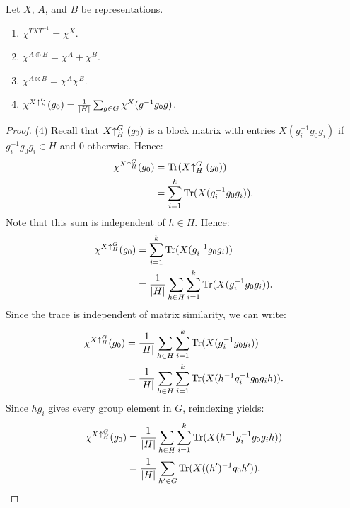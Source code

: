 \begin{proposition}
	Let $X$, $A$, and $B$ be representations.
	\mbox{}
	\begin{enumerate}[label = (\arabic*),itemsep=1pt,topsep=3pt]
		\item $\chi^{T X T^{-1}} = \chi^X$.
		\item $\chi^{A \oplus B} = \chi^A + \chi^B$.
		\item $\chi^{A \otimes B} = \chi^A \chi^B$.
		\item $\chi^{X \hspace{3pt}\uair_H^G}(g_0) = \frac{1}{|H|} \sum_{g \in G}^{} \chi^X(g^{-1}g_0 g)$.
	\end{enumerate}
\end{proposition}
	\begin{proof}
		(4) Recall that $X \hspace{-2.5pt}\uparrow_H^G(g_0)$ is a block matrix with entries $X(g_i^{-1} g_0 g_i)$ if $g_i^{-1}g_0g_i \in H$ and $0$ otherwise. Hence:
		\begin{align*}
			\chi^{X \hspace{3pt}\uair_H^G}(g_0)
			&= \Tr(X \uair_H^G(g_0)) \\
			&= \sum_{i=1}^{k} \Tr(X(g_i^{-1}g_0g_i)).
		\end{align*}
		Note that this sum is independent of $h \in H$. Hence:
		\begin{align*}
			\chi^{X \hspace{3pt}\uair_H^G}(g_0)
			&= \sum_{i=1}^{k} \Tr(X(g_i^{-1}g_0g_i))\\
			&=  \frac{1}{|H|}\sum_{h \in H}^{} \sum_{i=1}^{k} \Tr(X(g_i^{-1}g_0g_i)).
		\end{align*}
		Since the trace is independent of matrix similarity, we can write:
		\begin{align*}
			\chi^{X \hspace{3pt}\uair_H^G}(g_0)
			&=  \frac{1}{|H|}\sum_{h \in H}^{} \sum_{i=1}^{k} \Tr(X(g_i^{-1}g_0g_i)) \\
			&=  \frac{1}{|H|}\sum_{h \in H}^{} \sum_{i=1}^{k} \Tr(X(h^{-1}g_i^{-1}g_0g_ih)).
		\end{align*}
		Since $hg_i$ gives every group element in $G$, reindexing yields:
		\begin{align*}
			\chi^{X \hspace{3pt}\uair_H^G}(g_0)
			&=  \frac{1}{|H|}\sum_{h \in H}^{} \sum_{i=1}^{k} \Tr(X(h^{-1}g_i^{-1}g_0g_ih)) \\
			&= \frac{1}{|H|}\sum_{h' \in G}^{} \Tr(X((h')^{-1}g_0h')). \qedhere
		\end{align*}	
	\end{proof}

